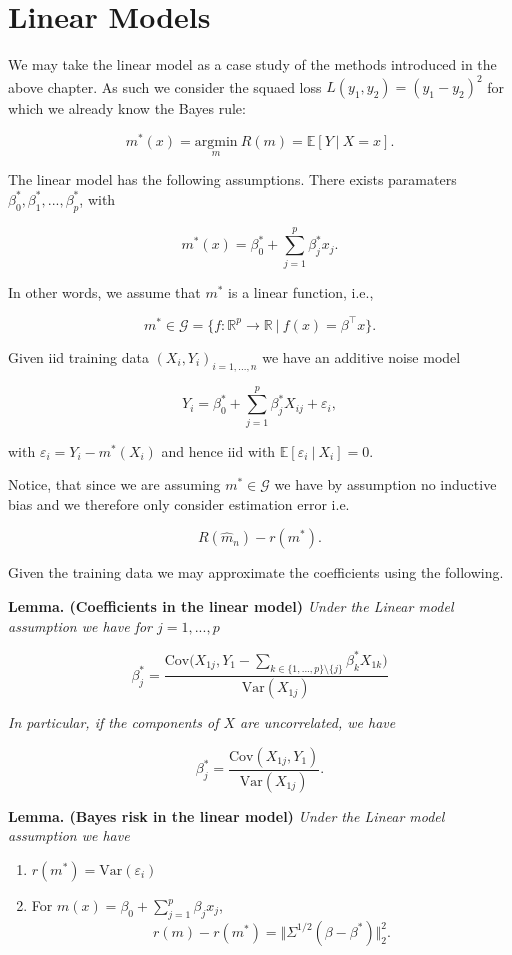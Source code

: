 \documentclass[a4paper,12pt,openany]{book}
\providecommand{\tightlist}{%
 \setlength{\itemsep}{0pt}\setlength{\parskip}{0pt}}
\begin{document}
\hypertarget{linear-models}{%
\section{Linear Models}\label{linear-models}}

We may take the linear model as a case study of the methods introduced in the above chapter. As such we consider the squaed loss \(L(y_1,y_2)=(y_1-y_2)^2\) for which we already know the Bayes rule:

\[
m^*(x)=\underset{m}{\text{argmin}}\ R(m)=\mathbb{E}[Y\ \vert\ X=x].
\]

The linear model has the following assumptions. There exists paramaters \(\beta_0^*,\beta_1^*,...,\beta_p^*\), with

\[
m^*(x)=\beta_0^*+\sum_{j=1}^{p}\beta_j^*x_j.
\]

In other words, we assume that \(m^*\) is a linear function, i.e.,

\[
m^*\in\mathcal{G}=\{f : \mathbb{R}^p\to \mathbb{R}\ \vert\ f(x)=\beta^\top x\}.
\]

Given iid training data \((X_i,Y_i)_{i=1,...,n}\) we have an additive noise model

\[
Y_i=\beta_0^*+\sum_{j=1}^{p}\beta_j^*X_{ij}+\varepsilon_i,
\]

with \(\varepsilon_i=Y_i-m^*(X_i)\) and hence iid with \(\mathbb{E}[\varepsilon_i\ \vert\ X_i]=0\).

Notice, that since we are assuming \(m^*\in\mathcal{G}\) we have by assumption no inductive bias and we therefore only consider estimation error i.e.

\[
R(\hat{m}_n)-r(m^*).
\]

Given the training data we may approximate the coefficients using the following.

\textbf{Lemma. (Coefficients in the linear model)} \emph{Under the Linear model assumption we have for \(j=1,...,p\)}

\[
\beta^*_j=\frac{\text{Cov}\Big(X_{1j},Y_1-\sum_{k\in \{1,...,p\}\setminus \{j\}} \beta_k^*X_{1k}\Big)}{\text{Var}(X_{1j})}
\]

\emph{In particular, if the components of \(X\) are uncorrelated, we have}

\[
\beta_j^*=\frac{\text{Cov}(X_{1j},Y_1)}{\text{Var}(X_{1j})}.
\]

\textbf{Lemma. (Bayes risk in the linear model)} \emph{Under the Linear model assumption we have}

\begin{enumerate}
\def\labelenumi{\arabic{enumi}.}
\tightlist
\item
  \(r(m^*)=\text{Var}(\varepsilon_i)\)
\item
  For \(m(x)=\beta_0+\sum_{j=1}^p \beta_jx_j\),
  \[
    r(m)-r(m^*)=\Vert\Sigma^{1/2}(\beta -\beta^*) \Vert^2_2.
    \]
\end{enumerate}
\end{document}
